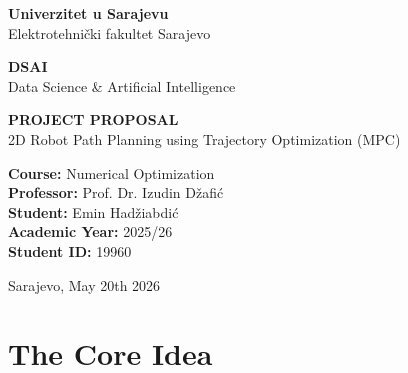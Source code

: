 \documentclass[12pt]{article}
\begin{document}
\begin{titlepage}
    \centering

    \begin{minipage}{0.45\textwidth}
        \centering
        \textbf{Univerzitet u Sarajevu}\\
        Elektrotehnički fakultet Sarajevo
    \end{minipage}
    \hfill
    \begin{minipage}{0.45\textwidth}
        \centering
        \textbf{DSAI}\\
        Data Science \& Artificial Intelligence
    \end{minipage}

    \vspace{4cm}

    {\LARGE \bfseries PROJECT PROPOSAL}\\[0.5cm]
    {\Large 2D Robot Path Planning using Trajectory Optimization (MPC)}

    \vspace{5cm}

    \begin{flushleft}
        \textbf{Course:} Numerical Optimization\\[0.3cm]
        \textbf{Professor:} Prof. Dr. Izudin Džafić\\[0.3cm]
        \textbf{Student:} Emin Hadžiabdić\\[0.3cm]
        \textbf{Academic Year:} 2025/26\\[0.3cm]
        \textbf{Student ID:} 19960
    \end{flushleft}

    \vfill

    {\large Sarajevo, May 20th 2026}

\end{titlepage}

\tableofcontents
\newpage


\section*{The Core Idea}
\end{document}
